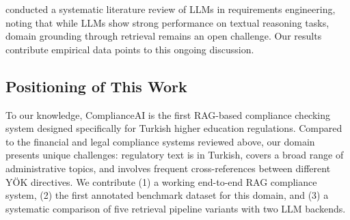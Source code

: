 \citet{Zadenoori2025} conducted a systematic literature review of LLMs in requirements engineering, noting that while LLMs show strong performance on textual reasoning tasks, domain grounding through retrieval remains an open challenge. Our results contribute empirical data points to this ongoing discussion.

\subsection{Positioning of This Work}

To our knowledge, ComplianceAI is the first RAG-based compliance checking system designed specifically for Turkish higher education regulations. Compared to the financial and legal compliance systems reviewed above, our domain presents unique challenges: regulatory text is in Turkish, covers a broad range of administrative topics, and involves frequent cross-references between different YÖK directives. We contribute (1) a working end-to-end RAG compliance system, (2) the first annotated benchmark dataset for this domain, and (3) a systematic comparison of five retrieval pipeline variants with two LLM backends.
